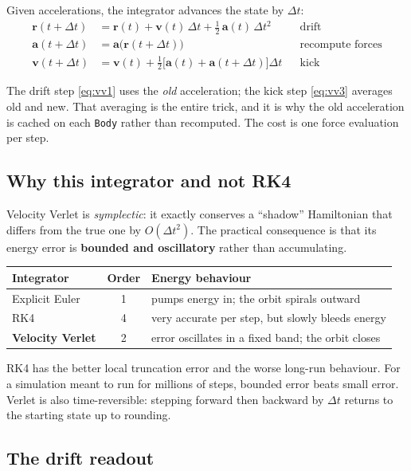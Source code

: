 \documentclass[11pt,a4paper]{article}
\newcommand{\vr}{\mathbf{r}}
\newcommand{\vv}{\mathbf{v}}
\newcommand{\va}{\mathbf{a}}
\newcommand{\dt}{\Delta t}
\begin{document}
Given accelerations, the integrator advances the state by $\dt$:
\begin{align}
  \vr(t+\dt) &= \vr(t) + \vv(t)\,\dt + \tfrac12\,\va(t)\,\dt^{2}
    &&\text{drift}\label{eq:vv1}\\
  \va(t+\dt) &= \va\bigl(\vr(t+\dt)\bigr)
    &&\text{recompute forces}\label{eq:vv2}\\
  \vv(t+\dt) &= \vv(t) + \tfrac12\bigl[\va(t) + \va(t+\dt)\bigr]\dt
    &&\text{kick}\label{eq:vv3}
\end{align}

The drift step \eqref{eq:vv1} uses the \emph{old} acceleration; the kick step
\eqref{eq:vv3} averages old and new. That averaging is the entire trick, and it is why the old
acceleration is cached on each \texttt{Body} rather than recomputed. The cost is
one force evaluation per step.

\subsection{Why this integrator and not RK4}

Velocity Verlet is \emph{symplectic}: it exactly conserves a ``shadow''
Hamiltonian that differs from the true one by $O(\dt^{2})$. The practical
consequence is that its energy error is \textbf{bounded and oscillatory} rather
than accumulating.

\begin{center}
\begin{tabular}{@{}lcl@{}}
\toprule
\textbf{Integrator} & \textbf{Order} & \textbf{Energy behaviour}\\
\midrule
Explicit Euler        & 1 & pumps energy in; the orbit spirals outward\\
RK4                   & 4 & very accurate per step, but slowly bleeds energy\\
\textbf{Velocity Verlet} & 2 & error oscillates in a fixed band; the orbit closes\\
\bottomrule
\end{tabular}
\end{center}

RK4 has the better local truncation error and the worse long-run behaviour. For
a simulation meant to run for millions of steps, bounded error beats small
error. Verlet is also time-reversible: stepping forward then backward by $\dt$
returns to the starting state up to rounding.

\subsection{The drift readout}
\end{document}

